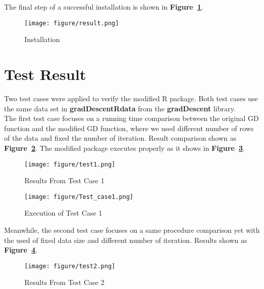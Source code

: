 \documentclass[12pt, letterpaper]{article} %
\begin{document}
\noindent
The final step of a successful installation is shown in \textbf{Figure~\ref{fig:install}}.
\newpage
\begin{figure}[htpb!] %
    \centering %
\texttt{[image: figure/result.png]}%
    \caption{Installation} %
    \label{fig:install} %
\end{figure}

\vspace*{-12mm}
\section{Test Result}
\vspace*{-3mm}
Two test cases were applied to verify the modified R package. Both test cases use the same data set in \textbf{gradDescentRdata} from the \textbf{gradDescent} library.\\ 
\noindent
The first test case focuses on a running time comparison between the original GD function and the modified GD function, where we used different number of rows of the data and fixed the number of iteration. Result comparison shown as \textbf{Figure~\ref{fig:test1}}. The modified package executes properly as it shows in \textbf{Figure~\ref{fig:testcase1}}.
\newpage
\vspace*{-8mm}
\begin{figure}[htpb!] %
    \centering %
\texttt{[image: figure/test1.png]}%
    \caption{Results From Test Case 1} %
    \label{fig:test1} %
\end{figure}
\begin{figure}[htpb!] %
    \centering %
\texttt{[image: figure/Test\_case1.png]}%
    \caption{Execution of Test Case 1} %
    \label{fig:testcase1} %
\end{figure}
\noindent
Meanwhile, the second test case focuses on a same procedure comparison yet with the used of fixed data size and different number of iteration. Results shown as \textbf{Figure~\ref{fig:test2}}.
\begin{figure}[htpb!] %
    \centering %
\texttt{[image: figure/test2.png]}%
    \caption{Results From Test Case 2} %
    \label{fig:test2} %
\end{figure}\\
\end{document}
